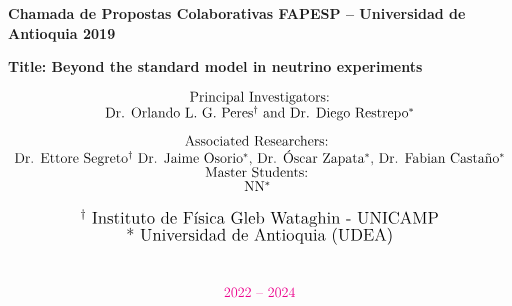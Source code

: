 \documentclass[a4paper,10pt,epsfig,epsf,amsfonts,amsmath]{article}
\begin{document}
\begin{figure}
    
\end{figure}

\null
{\color{blue}
\centerline{ \huge \bf  
 }
 \vskip 0.5cm
 \centerline{ \bf 
 Chamada de Propostas Colaborativas FAPESP – Universidad de Antioquia 2019}
\vskip 1.2cm
\centerline{\huge \bf   Title: Beyond the standard model in neutrino experiments  }
}
\vskip 2cm
\[
\begin{array}{c}
 \mbox{\large Principal Investigators:} \\
\mbox{\large Dr. Orlando L. G. Peres$^\dagger$ and Dr. Diego Restrepo$^*$}\\
\\
\mbox{\large Associated Researchers: }\\
\mbox{\large %
Dr. Ettore Segreto$^\dagger$ Dr. Jaime Osorio$^*$, Dr. \'Oscar Zapata$^*$,  Dr. Fabian Casta\~no$^*$}\\
\mbox{\large Master Students: }\\
\mbox{\large 
NN$^*$
}
\\
\\
\mbox{\Large $^\dagger$ Instituto de F\'\i sica Gleb Wataghin - UNICAMP}\\
\mbox{\Large * Universidad de Antioquia (UDEA)} \\
\\
\\
\\
\mbox{\large {\color{magenta}2022 -- 2024}}
\end{array}
\]
\vfill

\newpage
\end{document}
